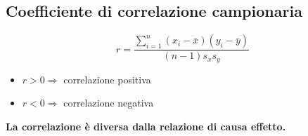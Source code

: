 \subsection{Coefficiente di correlazione campionaria}

\begin{equation}
   r = \displaystyle\frac{
        \displaystyle\sum_{i = 1}^{n} (x_i - \bar{x})(y_i - \bar{y})
   }{
        (n - 1)s_xs_y
   } 
\end{equation}


\begin{itemize}
    \item $r > 0 \Rightarrow$ correlazione positiva
    \item $r < 0 \Rightarrow$ correlazione negativa
\end{itemize}

\textbf{La correlazione è diversa dalla relazione di causa effetto.}


